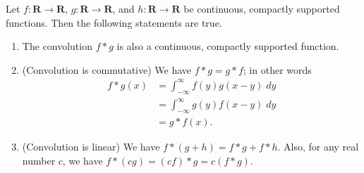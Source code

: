 \begin{proposition}\label{3.8.11}
    Let \(f : \mathbf{R} \to \mathbf{R}\), \(g : \mathbf{R} \to \mathbf{R}\), and \(h : \mathbf{R} \to \mathbf{R}\) be continuous, compactly supported functions.
    Then the following statements are true.
    \begin{enumerate}
        \item The convolution \(f * g\) is also a continuous, compactly supported function.
        \item (Convolution is commutative)
              We have \(f * g = g * f\);
              in other words
              \begin{align*}
                  f * g(x) & = \int_{-\infty}^\infty f(y) g(x - y) \; dy \\
                           & = \int_{-\infty}^\infty g(y) f(x - y) \; dy \\
                           & = g * f(x).
              \end{align*}
        \item (Convolution is linear)
              We have \(f * (g + h) = f * g + f * h\).
              Also, for any real number \(c\), we have \(f * (cg) = (cf) * g = c(f * g)\).
    \end{enumerate}
\end{proposition}

